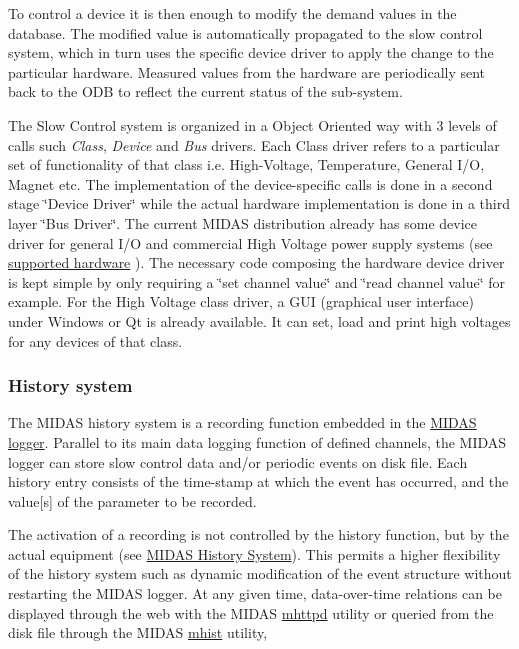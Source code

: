 To control a device it is then enough to modify the demand values in the database. The modified value is automatically propagated to the slow control system, which in turn uses the specific device driver to apply the change to the particular hardware. Measured values from the hardware are periodically sent back to the ODB to reflect the current status of the sub-\/system.

The Slow Control system is organized in a Object Oriented way with 3 levels of calls such {\itshape Class\/}, {\itshape Device\/} and {\itshape Bus\/} drivers. Each Class driver refers to a particular set of functionality of that class i.e. High-\/Voltage, Temperature, General I/O, Magnet etc. The implementation of the device-\/specific calls is done in a second stage \char`\"{}Device Driver\char`\"{} while the actual hardware implementation is done in a third layer \char`\"{}Bus Driver\char`\"{}. The current MIDAS distribution already has some device driver for general I/O and commercial High Voltage power supply systems (see \hyperlink{FE_Hardware}{supported hardware} ). The necessary code composing the hardware device driver is kept simple by only requiring a \char`\"{}set channel value\char`\"{} and \char`\"{}read channel value\char`\"{} for example. For the High Voltage class driver, a GUI (graphical user interface) under Windows or Qt is already available. It can set, load and print high voltages for any devices of that class.

\label{F_MainElements_idx_history_system_overview}
\hypertarget{F_MainElements_idx_history_system_overview}{}
 \hypertarget{F_MainElements_F_History_System_overview}{}\subsubsection{History system}\label{F_MainElements_F_History_System_overview}
The MIDAS history system is a recording function embedded in the \hyperlink{F_Logging_F_mlogger_utility}{MIDAS logger}. Parallel to its main data logging function of defined channels, the MIDAS logger can store slow control data and/or periodic events on disk file. Each history entry consists of the time-\/stamp at which the event has occurred, and the value\mbox{[}s\mbox{]} of the parameter to be recorded.

The activation of a recording is not controlled by the history function, but by the actual equipment (see \hyperlink{F_History_logging_F_History_System}{MIDAS History System}). This permits a higher flexibility of the history system such as dynamic modification of the event structure without restarting the MIDAS logger. At any given time, data-\/over-\/time relations can be displayed through the web with the MIDAS \hyperlink{RC_mhttpd_utility}{mhttpd} utility or queried from the disk file through the MIDAS \hyperlink{F_History_logging_F_mhist_utility}{mhist} utility,

